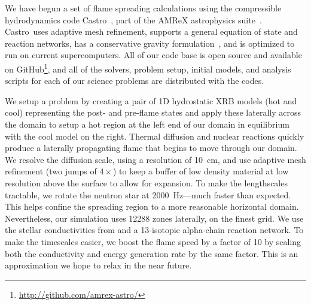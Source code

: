 \documentclass[a4paper]{jpconf}
\newcommand{\castro}{{\sffamily Castro}}
\begin{document}
We have begun a set of flame spreading calculations using the
compressible hydrodynamics code \castro~\cite{castro}, part of the
AMReX astrophysics suite~\cite{astronum:2017}.  \castro\ uses adaptive
mesh refinement, supports a general equation of state and reaction
networks, has a conservative gravity formulation~\cite{wdmergerI}, and
is optimized to run on current supercomputers.  All of our code base
is open source and available on
GitHub\footnote{\url{http://github.com/amrex-astro/}}, and all of the
solvers, problem setup, initial models, and analysis scripts for each
of our science problems are distributed with the codes.

We setup a problem by creating a pair of 1D hydrostatic XRB models (hot and cool)
representing the post- and pre-flame states and apply these laterally
across the domain to setup a hot region at the left end of our domain
in equilibrium with the cool model on the right.  Thermal diffusion and nuclear
reactions quickly produce a laterally propagating flame that begins to
move through our domain.  We resolve the diffusion scale, using a
resolution of 10~cm, and use adaptive mesh refinement (two jumps of
$4\times$) to keep a buffer of low density material at low resolution
above the surface to allow for expansion.  To make the lengthscales
tractable, we rotate the neutron star at 2000~Hz---much faster than
expected.  This helps confine the spreading region to a more
reasonable horizontal domain.  Nevertheless, our simulation uses 12288
zones laterally, on the finest grid.  We use the stellar
conductivities from \cite{Timmes00} and a 13-isotopic alpha-chain
reaction network.  To make the timescales easier, we boost the flame
speed by a factor of 10 by scaling both the conductivity and energy
generation rate by the same factor.  This is an approximation we hope to
relax in the near future.
\end{document}
